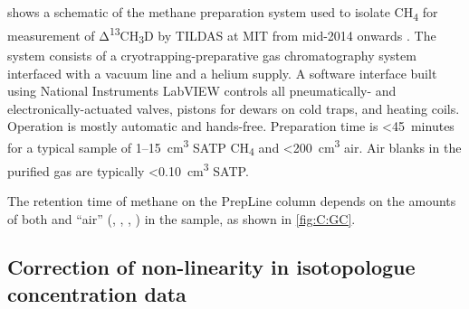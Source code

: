

 shows a schematic of the methane preparation system used to
isolate CH\textsubscript{4} for measurement of
Δ\textsuperscript{13}CH\textsubscript{3}D by TILDAS at MIT from mid-2014
onwards \parencite{Wang++_2015_S,Inagaki++_2015_S,Wang++_2016_GCA,Lopes++_2016_JoDS,Whitehill++_2017_GCA}. The system consists of a
cryotrapping-preparative gas chromatography system interfaced with a
vacuum line and a helium supply. A software interface built using
National Instruments LabVIEW controls all pneumatically- and
electronically-actuated valves, pistons for dewars on cold traps, and
heating coils. Operation is mostly automatic and hands-free.
Preparation time is \textless{}45~minutes for a typical sample of
1--15~cm\textsuperscript{3} SATP CH\textsubscript{4} and
\textless{}200~cm\textsuperscript{3} air. Air blanks in the purified gas
are typically \textless{}0.10~cm\textsuperscript{3} SATP.

The retention time of methane on the PrepLine column depends on the amounts of both  and ``air'' (, , , )
in the sample, as shown in \autoref{fig:C:GC}.



\subsection{Correction of non-linearity in isotopologue concentration
	data}\label{correction-of-non-linearity-in-isotopologue-concentration-data-returned-by-tdlwintel}

